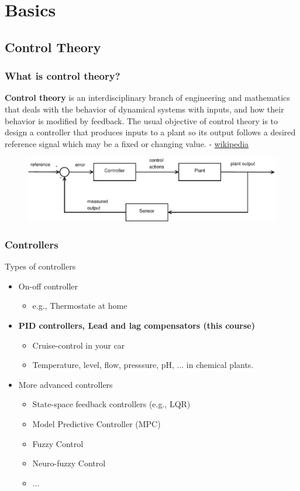 \section{Basics}

\subsection[Control Theory]{Control Theory}
\begin{frame}
\frametitle{What is control theory?}
\begin{block}{}
	\textbf{Control theory} is an interdisciplinary branch of engineering and mathematics that deals with the behavior of dynamical systems with inputs, and how their behavior is modified by feedback. The usual objective of control theory is to design a controller that produces inputs to a plant so its output follows a desired reference signal which may be a fixed or changing value. - \href{https://en.wikipedia.org/wiki/Control_theory}{wikipedia} 
\end{block}
\begin{figure}
	\centering
	\includegraphics[width=1\linewidth]{controlsystem}
	\label{fig:controlsystem}
\end{figure}
\end{frame}

\begin{frame}
	\frametitle{Controllers}
	\begin{block}{Types of controllers}
		\begin{itemize}
			\item On-off controller
			\begin{itemize}
				\item e.g., Thermostate at home
			\end{itemize}
			\item \textbf{PID controllers, Lead and lag compensators (this course)}
			\begin{itemize}
				\item Cruise-control in your car
				\item Temperature, level, flow, presssure, pH, ... in chemical plants.
			\end{itemize}
			\item More advanced controllers
			\begin{itemize}
				\item State-space feedback controllers (e.g., LQR)
				\item Model Predictive Controller (MPC)
				\item Fuzzy Control
				\item Neuro-fuzzy Control
				\item ...
			\end{itemize}
		\end{itemize}
	\end{block}
\end{frame}


